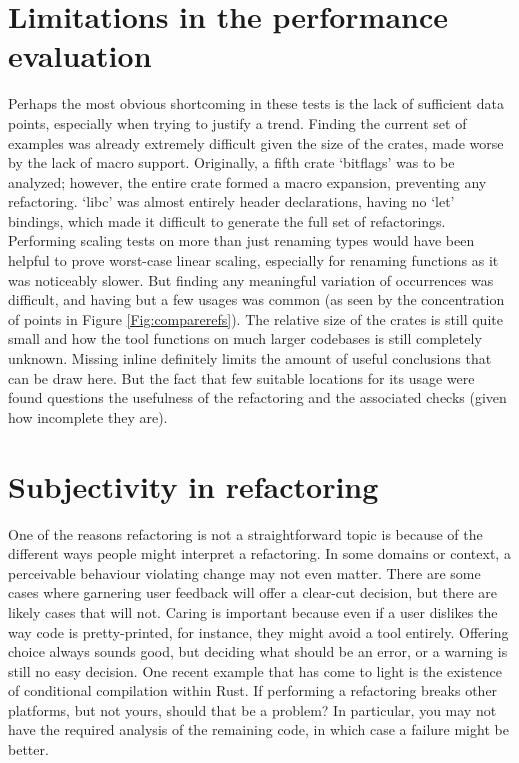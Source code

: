 \section{Limitations in the performance evaluation}
Perhaps the most obvious shortcoming in these tests is the lack of sufficient data points, especially when trying to justify a trend. Finding the current set of examples was already extremely difficult given the size of the crates, made worse by the lack of macro support. Originally, a fifth crate `bitflags' was to be analyzed; however, the entire crate formed a macro expansion, preventing any refactoring. `libc' was almost entirely header declarations, having no `let' bindings, which made it difficult to generate the full set of refactorings. Performing scaling tests on more than just renaming types would have been helpful to prove worst-case linear scaling, especially for renaming functions as it was noticeably slower. But finding any meaningful variation of occurrences was difficult, and having but a few usages was common (as seen by the concentration of points in Figure \ref{Fig:comparerefs}). The relative size of the crates is still quite small and how the tool functions on much larger codebases is still completely unknown. Missing inline definitely limits the amount of useful conclusions that can be draw here. But the fact that few suitable locations for its usage were found questions the usefulness of the refactoring and the associated checks (given how incomplete they are). 

\section{Subjectivity in refactoring}
One of the reasons refactoring is not a straightforward topic is because of the different ways people might interpret a refactoring. In some domains or context, a perceivable behaviour violating change may not even matter. There are some cases where garnering user feedback will offer a clear-cut decision, but there are likely cases that will not. Caring is important because even if a user dislikes the way code is pretty-printed, for instance, they might avoid a tool entirely. Offering choice always sounds good, but deciding what should be an error, or a warning is still no easy decision. One recent example that has come to light is the existence of conditional compilation within Rust. If performing a refactoring breaks other platforms, but not yours, should that be a problem? In particular, you may not have the required analysis of the remaining code, in which case a failure might be better.

